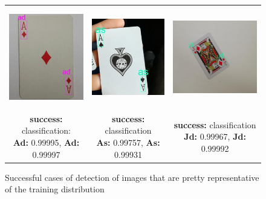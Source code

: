 \documentclass[a4paper]{article}
\begin{document}
\begin{figure}[h]

\begin{tabular}{ccc}

 \includegraphics[height=44mm]{images/ad} &   \includegraphics[height=44mm]{images/as} &   \includegraphics[height=44mm]{images/jd}\\
\makecell{\textbf{success:} classification: \\ \textbf{Ad:} 0.99995, \textbf{Ad:} 0.99997}  & \makecell{\textbf{success:}  classification \\ \textbf{As:} 0.99757, \textbf{As:} 0.99931} & \makecell{\textbf{success:}  classification \\ \textbf{Jd:} 0.99967, \textbf{Jd:} 0.99992}\\[6pt]




\end{tabular}
\caption{Successful cases of detection of images that are pretty representative of the training distribution}
\label{fig:testcases}
\end{figure}
\end{document}
